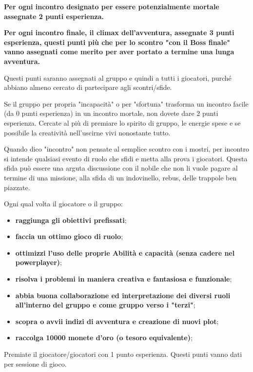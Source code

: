 \documentclass[a4paper,11pt,twoside,openany]{book}
\begin{document}
{\textbf{Per ogni incontro designato per essere potenzialmente mortale assegnate 2 punti esperienza.}

\textbf{Per ogni incontro finale, il climax dell'avventura, assegnate 3 punti esperienza, questi punti più che per lo scontro "con il Boss finale" vanno assegnati come merito per aver portato a termine una lunga avventura.}

Questi punti saranno assegnati al gruppo e quindi a tutti i giocatori, purché abbiano almeno cercato di partecipare agli scontri/sfide.

Se il gruppo per propria "incapacità" o per "sfortuna" trasforma un incontro facile (da 0 punti esperienza) in un incontro mortale, non dovete dare 2 punti esperienza. Cercate al più di premiare lo spirito di gruppo, le energie spese e se possibile la creatività nell'uscirne vivi  nonostante tutto.

Quando dico "incontro" non pensate al semplice scontro con i mostri, per incontro si intende qualsiasi evento di ruolo che sfidi e metta alla prova i giocatori. Questa sfida può essere una arguta discussione con il nobile che non li vuole pagare al termine di una missione, alla sfida di un indovinello, rebus, delle trappole ben piazzate.

\bigskip

Ogni qual volta il giocatore o il gruppo:
\begin{itemize}
\item 
\textbf{raggiunga gli obiettivi prefissati}; 
\item 
\textbf{faccia un ottimo gioco di ruolo}; 
\item 
\textbf{ottimizzi l'uso delle proprie Abilità e capacità (senza cadere nel powerplayer)}; 
\item 
\textbf{risolva i problemi in maniera creativa e fantasiosa e funzionale}; 
\item 
\textbf{abbia buona collaborazione ed interpretazione dei diversi ruoli all'interno del gruppo e come gruppo verso i "terzi"}; 
\item 
\textbf{scopra o avvii indizi di avventura e creazione di nuovi plot};
\item
\textbf{raccolga 10000 monete d'oro (o tesoro equivalente)};
\end{itemize}

\bigskip

Premiate il giocatore/giocatori con 1 punto esperienza. Questi punti vanno dati per sessione di gioco.

}
\end{document}
